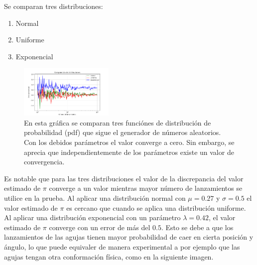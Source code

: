 \documentclass{rbf}
\begin{document}
Se comparan tres distribuciones:
\begin{enumerate}
    \item Normal
    \item Uniforme
    \item Exponencial
\end{enumerate}

\begin{figure}[tbp!]
 \centering
  \includegraphics[width=0.4\textwidth]{figures/grafica.png}
	\caption{En esta gráfica se comparan tres funciónes de distribución de probabilidad (pdf) que sigue el generador de números aleatorios. Con los debidos parámetros el valor converge a cero. Sin embargo, se aprecia que independientemente de los parámetros existe un valor de convergencia. }
 \label{buff5}
\end{figure}
Es notable que para las tres distribuciones el valor de la discrepancia del valor estimado de $\pi$ converge a un valor mientras mayor número de lanzamientos se utilice en la prueba. Al aplicar una distribución normal con $\mu=0.27$ y  $\sigma=0.5$ el valor estimado de $\pi$ es cercano que cuando se aplica una distribución uniforme. Al aplicar una distribución exponencial con un parámetro $\lambda=0.42$, el valor estimado de $\pi$ converge con un error de más del $0.5$. Esto se debe a que los lanzamientos de las agujas tienen mayor probabilidad de caer en cierta posición y ángulo, lo que puede equivaler de manera experimental a por ejemplo que las agujas tengan otra conformación física, como en la siguiente imagen.
\end{document}
